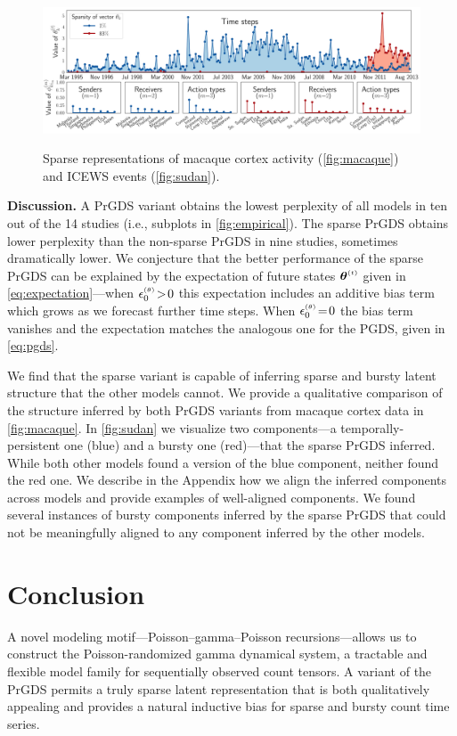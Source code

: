 \documentclass{article}
\begin{document}
\begin{figure}[t]
{\label{fig:sudan}
\includegraphics[width=\linewidth]{../../fig/components/icews/zero-ordering/double_plots/eps0-components72-0.pdf}
}
% 
\caption{\label{fig:exploratory} Sparse representations of macaque cortex activity (\cref{fig:macaque}) and ICEWS events (\cref{fig:sudan}).}\vspace{-1em}
\end{figure}

\textbf{Discussion.} A PrGDS variant obtains the lowest perplexity of all models in ten out of the 14 studies (i.e., subplots in \cref{fig:empirical}). The sparse PrGDS obtains lower perplexity than the non-sparse PrGDS in nine studies, sometimes dramatically lower. We conjecture that the better performance of the sparse PrGDS can be explained by the expectation of future states $\boldsymbol{\theta}^{\mathsmaller{(t)}}$ given in \cref{eq:expectation}---when $\epstheta \!>\! 0$ this expectation includes an additive bias term which grows as we forecast further time steps. When $\epstheta \teq 0$ the bias term vanishes and the expectation matches the analogous one for the PGDS, given in \cref{eq:pgds}.~ 

We find that the sparse variant is capable of inferring sparse and bursty latent structure that the other models cannot. We provide a qualitative comparison of the structure inferred by both PrGDS variants from macaque cortex data in \cref{fig:macaque}. In \cref{fig:sudan} we visualize two components---a temporally-persistent one (blue) and a bursty one (red)---that the sparse PrGDS inferred. While both other models found a version of the blue component, neither found the red one. We describe in the Appendix how we align the inferred components across models and provide examples of well-aligned components. We found several instances of bursty components inferred by the sparse PrGDS that could not be meaningfully aligned to any component inferred by the other models.


\vspace{-0.5em}\section{Conclusion}\vspace{-0.5em} A novel modeling motif---Poisson--gamma--Poisson recursions---allows us to construct the Poisson-randomized gamma dynamical system, a tractable and flexible model family for sequentially observed count tensors. A variant of the PrGDS permits a truly sparse latent representation that is both qualitatively appealing and provides a natural inductive bias for sparse and bursty count time series.
\end{document}
